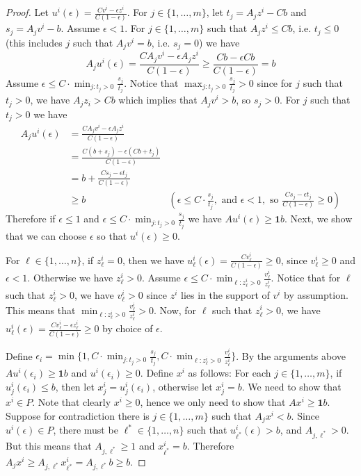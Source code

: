 \begin{proof}
	
	Let $u^i(\epsilon) = \frac{Cv^i-\epsilon z^i}{C(1-\epsilon)}$. For $j\in \{1,\ldots,m\}$, let $t_j = A_jz^i-Cb$ and $s_j=A_jv^i-b$. 
	Assume $\epsilon <1$. For $j\in \{1,\ldots,m\}$ such that $A_jz^i\leq Cb$, i.e. $t_j\leq 0$ (this includes $j$ such that $A_jv^i=b$, i.e. $s_j=0$) we have
	\begin{equation*}
	A_j u^i(\epsilon) = \frac{CA_jv^i-\epsilon A_jz^i}{C(1-\epsilon)}\geq \frac{Cb-\epsilon Cb}{C(1-\epsilon)}=b
	\end{equation*}
	Assume $\epsilon \leq C\cdot\min_{j: t_j >0} \frac{s_j}{t_j}$. Notice that $\max_{j: t_j >0} \frac{s_j}{t_j}>0$ since for $j$ such that $t_j>0$, we have $A_jz_i > Cb$ which implies that $A_jv^i>b$, so $s_j>0$. For $j$ such that $t_j>0$ we have
	\begin{align*}
	A_ju^i(\epsilon) &= \frac{CA_jv^i-\epsilon A_jz^i}{C(1-\epsilon)}& \\
	&= \frac{C(b+s_j)-\epsilon (Cb+t_j)}{C(1-\epsilon)}&\\
	&= b+ \frac{Cs_j-\epsilon t_j}{C(1-\epsilon)}&\\
	&\geq b & (\epsilon  \leq C\cdot  \frac{s_j}{t_j}, \mbox{ and } \epsilon <1, \mbox{ so } \frac{Cs_j-\epsilon t_j}{C(1-\epsilon)}\geq 0 )
	\end{align*} 
	Therefore if $\epsilon \leq 1$ and $\epsilon \leq C\cdot\min_{j: t_j >0} \frac{s_j}{t_j}$ we have $Au^i(\epsilon)\geq \textbf{1}b$. Next, we show that we can choose $\epsilon$ so that $ u^i(\epsilon)\geq 0$.
	
	For $\ell\in \{1,\ldots,n\}$, if $z^i_\ell=0$, then we have $u_\ell^i(\epsilon) = \frac{Cv_\ell^i}{C(1-\epsilon)}\geq 0$, since $v^i_\ell\geq 0$ and $\epsilon <1$. Otherwise we have $z^i_\ell>0$. Assume $\epsilon \leq C\cdot \min_{ \ell:z^i_\ell>0}\frac{v^i_\ell}{z^i_\ell}$. Notice that for $\ell$ such that $z^i_\ell>0$, we have $v^i_\ell>0$ since $z^i$ lies in the support of $v^i$ by assumption. This means that $\min_{\ell:z^i_\ell>0}\frac{v^i_\ell}{z^i_\ell}>0$. Now, for $\ell$ such that $z^i_\ell>0$, we have $u^i_\ell(\epsilon) = \frac{Cv_\ell^i-\epsilon z_\ell^i}{C(1-\epsilon)}\geq 0$ by choice of $\epsilon$.
	
	Define $\epsilon_i =\min\{1, C\cdot \min_{j: t_j >0}\frac{s_j}{t_j},C\cdot\min_{\ell: z^i_\ell>0}\frac{v^i_\ell}{z^i_\ell}\}$. By the arguments above $Au^i(\epsilon_i)\geq \textbf{1}b$ and $u^i(\epsilon_i)\geq 0$. Define $x^i$ as follows: For each $j\in \{1,\ldots,m\}$, if $u^i_j(\epsilon_i)\leq b$, then let $x^i_j=u^i_j(\epsilon_i)$, otherwise let $x^i_j=b$. We need to show that $x^i\in P$. Note that clearly $x^i\geq 0$, hence we only need to show that $Ax^i\geq \textbf{1}b$. Suppose for contradiction there is $j\in \{1,\ldots,m\}$ such that $A_jx^i <b$. Since $u^i(\epsilon)\in P$, there must be $\ell^*\in\{1,\ldots,n\}$ such that $u^i_{\ell^*}(\epsilon)>b$, and $A_{j,\ell^*}>0$. But this means that $A_{j,\ell^*}\geq 1$ and $x^i_{\ell^*}=b$. Therefore $A_jx^i \geq  A_{j,\ell^*}x^i_{\ell^*}= A_{j,\ell^*}b\geq b$. \end{proof}
